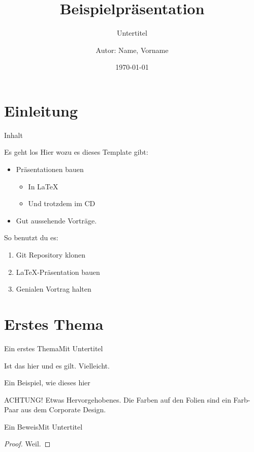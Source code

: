 \documentclass[german,10pt,compress,aspectratio=169]{beamer}
\title{Beispielpräsentation}
\subtitle{Untertitel}
\date[]{\today}
\author[Autor in Fußzeile]{Autor: Name, Vorname}
\institute[]{Fachbereich xy\\RPTU in Kaiserslautern}
\begin{document}
\maketitle
\section{Einleitung}
\begin{frame}{Inhalt}
	\tableofcontents
\end{frame}
\begin{frame}{Es geht los}
	Hier wozu es dieses Template gibt:
	\begin{itemize}
		\item Präsentationen bauen
		      \begin{itemize}
			      \item In \LaTeX
			      \item Und trotzdem im CD
		      \end{itemize}
		\item Gut aussehende Vorträge.
	\end{itemize}
	So benutzt du es:
	\begin{enumerate}
		\item Git Repository klonen
		\item \LaTeX-Präsentation bauen
		\item Genialen Vortrag halten
	\end{enumerate}
\end{frame}
\section{Erstes Thema}
\begin{frame}{Ein erstes Thema}{Mit Untertitel}
	\begin{lemma}
		Ist das hier und es gilt. Vielleicht.
	\end{lemma}
	\begin{example}
		Ein Beispiel, wie dieses hier
	\end{example}
	\alert{ACHTUNG!}
	Etwas Hervorgehobenes. Die Farben auf den Folien sind ein Farb-Paar aus dem Corporate Design.\\

\end{frame}
\begin{frame}{Ein Beweis}{Mit Untertitel}
	\begin{proof}
		Weil.
	\end{proof}
\end{frame}
\end{document}
